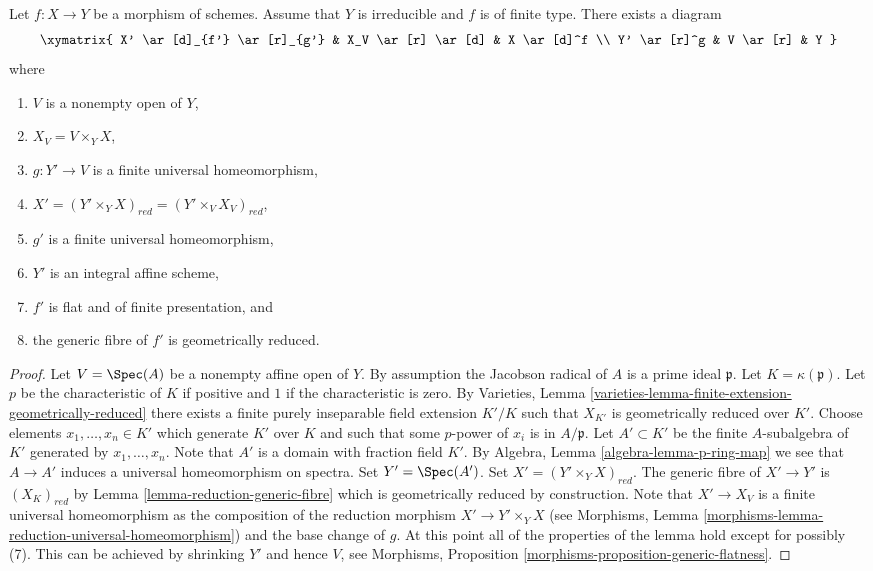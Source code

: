 \begin{lemma}
\label{lemma-make-generic-fibre-geometrically-reduced}
Let $f : X \to Y$ be a morphism of schemes.
Assume that $Y$ is irreducible and $f$ is of finite type.
There exists a diagram
$$
\xymatrix{
X' \ar[d]_{f'} \ar[r]_{g'} & X_V \ar[r] \ar[d] & X \ar[d]^f \\
Y' \ar[r]^g & V \ar[r] & Y
}
$$
where
\begin{enumerate}
\item $V$ is a nonempty open of $Y$,
\item $X_V = V \times_Y X$,
\item $g : Y' \to V$ is a finite universal homeomorphism,
\item $X' = (Y' \times_Y X)_{red} = (Y' \times_V X_V)_{red}$,
\item $g'$ is a finite universal homeomorphism,
\item $Y'$ is an integral affine scheme,
\item $f'$ is flat and of finite presentation, and
\item the generic fibre of $f'$ is geometrically reduced.
\end{enumerate}
\end{lemma}

\begin{proof}
Let $V = \Spec(A)$ be a nonempty affine open of $Y$.
By assumption the Jacobson radical of $A$ is a prime ideal $\mathfrak p$.
Let $K = \kappa(\mathfrak p)$.
Let $p$ be the characteristic of $K$ if positive and $1$
if the characteristic is zero. By
Varieties, Lemma \ref{varieties-lemma-finite-extension-geometrically-reduced}
there exists a finite purely inseparable field extension
$K'/K$ such that $X_{K'}$ is geometrically reduced over $K'$.
Choose elements $x_1, \ldots, x_n \in K'$ which generate $K'$ over
$K$ and such that some $p$-power of $x_i$ is in $A/\mathfrak p$.
Let $A' \subset K'$ be the finite $A$-subalgebra of $K'$ generated by
$x_1, \ldots, x_n$. Note that $A'$ is a domain with fraction field $K'$. By
Algebra, Lemma \ref{algebra-lemma-p-ring-map}
we see that $A \to A'$ induces a universal homeomorphism on spectra.
Set $Y' = \Spec(A')$. Set $X' = (Y' \times_Y X)_{red}$.
The generic fibre of $X' \to Y'$ is $(X_K)_{red}$ by
Lemma \ref{lemma-reduction-generic-fibre}
which is geometrically reduced by construction.
Note that $X' \to X_V$ is a finite universal homeomorphism as the
composition of the reduction morphism $X' \to Y' \times_Y X$ (see
Morphisms, Lemma \ref{morphisms-lemma-reduction-universal-homeomorphism})
and the base change of $g$.
At this point all of the properties of the lemma hold except for
possibly (7). This can be achieved by shrinking $Y'$ and hence $V$, see
Morphisms, Proposition \ref{morphisms-proposition-generic-flatness}.
\end{proof}

